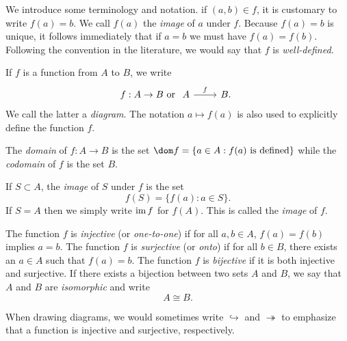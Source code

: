 \begin{sectionthm}
    We introduce some terminology and notation. if \((a, b) \in f\), it is
    customary to write \(f(a) = b\). We call \(f(a)\) the \emph{image} of \(a\)
    under \(f\). Because \(f(a) = b\) is unique, it follows immediately that if
    \(a = b\) we must have \(f(a) = f(b)\). Following the convention in the
    literature, we would say that \(f\) is \emph{well-defined.}

    If \(f\) is a function from \(A\) to \(B\), we write
    \[
        f: A \to B \text{ or } \begin{tikzcd}
            A \arrow[r, "f"] & B.
        \end{tikzcd}
    \]
    We call the latter a \emph{diagram}. The notation \(a \mapsto f(a)\) is also used to explicitly define the
    function \(f\).

    The \emph{domain} of \(f : A \to B\) is the set \(\dom f = \{a \in A : f(a)
    \text{ is defined}\}\) while the \emph{codomain} of \(f\) is the set \(B\). 

    If \(S \subset A\), the \emph{image} of \(S\) under \(f\) is the set
    \[
        f(S) = \{f(a) : a \in S\}.
    \]
    If \(S = A\) then we simply write \(\operatorname{im} f\) for \(f(A)\). This is called
    the \emph{image} of \(f\).
\end{sectionthm}

\begin{sectionthm}
    The function \(f\) is \emph{injective} (or \emph{one-to-one}) if for all
    \(a, b \in A\), \(f(a) = f(b)\) implies \(a = b\). The function \(f\) is
    \emph{surjective} (or \emph{onto}) if for all \(b \in B\), there exists an
    \(a \in A\) such that \(f(a) = b\). The function \(f\) is \emph{bijective}
    if it is both injective and surjective. If there exists a bijection between two sets \(A\) and \(B\), we say that \(A\) and \(B\) are \emph{isomorphic} and write
    \[
        A \cong B.
    \]

    When drawing diagrams, we would sometimes write \(\hookrightarrow\) and \(\twoheadrightarrow\) to emphasize that a function is injective and surjective, respectively.
\end{sectionthm}

